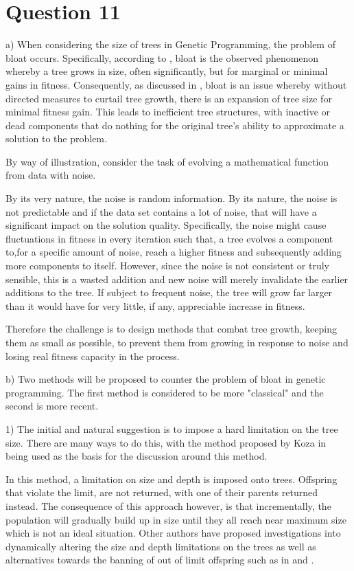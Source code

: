 \documentclass[12pt]{article}
\begin{document}
\section{Question 11}
a) When considering the size of trees in Genetic Programming, the problem of bloat occurs. Specifically, according to \cite{Poli:2008:FGG:1796422}, bloat is the observed phenomenon whereby a tree grows in size, often significantly, but for marginal or minimal gains in fitness. Consequently, as discussed in \cite{trujillo_naredo_martínez_2013}, bloat is an issue whereby without directed measures to curtail tree growth, there is an expansion of tree size for minimal fitness gain. This leads to inefficient tree structures, with inactive or dead components that do nothing for the original tree's ability to approximate a solution to the problem.

	By way of illustration, consider the task of evolving a mathematical function from data with noise.

	By its very nature, the noise is random information. By its nature, the noise is not predictable and if the data set contains a lot of noise, that will have a significant impact on the solution quality. Specifically, the noise might cause fluctuations in fitness in every iteration such that, a tree evolves a component to,for a specific amount of noise, reach a higher fitness and subsequently adding more components to itself. However, since the noise is not consistent or truly sensible, this is a wasted addition and new noise will merely invalidate the earlier additions to the tree. If subject to frequent noise, the tree will grow far larger than it would have for very little, if any, appreciable increase in fitness. 

	Therefore the challenge is to design methods that combat tree growth, keeping them as small as possible, to prevent them from growing in response to noise and losing real fitness capacity in the process.

	b) Two methods will be proposed to counter the problem of bloat in genetic programming.
	The first method is considered to be more "classical" and the second is more recent.


		1) The initial and natural suggestion is to impose a hard limitation on the tree size. There are many ways to do this, with the method proposed by Koza in \cite{koza_2000} being used as the basis for the discussion around this method. 

		In this method, a limitation on size and depth is imposed onto trees. Offspring that violate the limit, are not returned, with one of their parents returned instead. The consequence of this approach however, is that incrementally, the population will gradually build up in size until they all reach near maximum size which is not an ideal situation. Other authors have proposed investigations into dynamically altering the size and depth limitations on the trees as well as alternatives towards the banning of out of limit offspring such as in \cite{silva_costa_2005} and \cite{silva_silva_costa_2005_2}.
\end{document}
